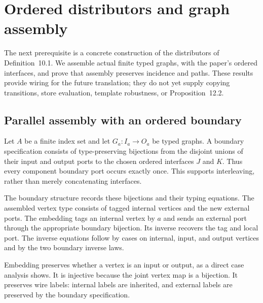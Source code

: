 \clearpage
\section{Ordered distributors and graph assembly}
\label{sec:copying-assembly}
The next prerequisite is a concrete construction of the distributors of
Definition~10.1. We assemble actual finite typed graphs, with the paper's
ordered interfaces, and prove that assembly preserves incidence and paths.
These results provide wiring for the future translation; they do not yet
supply copying transitions, store evaluation, template robustness, or
Proposition~12.2.

\subsection{Parallel assembly with an ordered boundary}
Let $A$ be a finite index set and let $G_a:I_a\to O_a$ be typed graphs.
A boundary specification consists of type-preserving bijections from the
disjoint unions of their input and output ports to the chosen ordered
interfaces $J$ and $K$. Thus every component boundary port occurs exactly once.
This supports interleaving, rather than merely concatenating interfaces.

The boundary structure records these bijections and their typing equations.
The assembled vertex type consists of tagged internal vertices and the new
external ports. The embedding tags an internal vertex by $a$ and sends an
external port through the appropriate boundary bijection. Its inverse
recovers the tag and local port. The inverse equations follow by cases on
internal, input, and output vertices and by the two boundary inverse laws.





Embedding preserves whether a vertex is an input or output, as a direct
case analysis shows. It is injective because the joint vertex map is a
bijection. It preserves wire labels: internal labels are inherited, and
external labels are preserved by the boundary specification.




